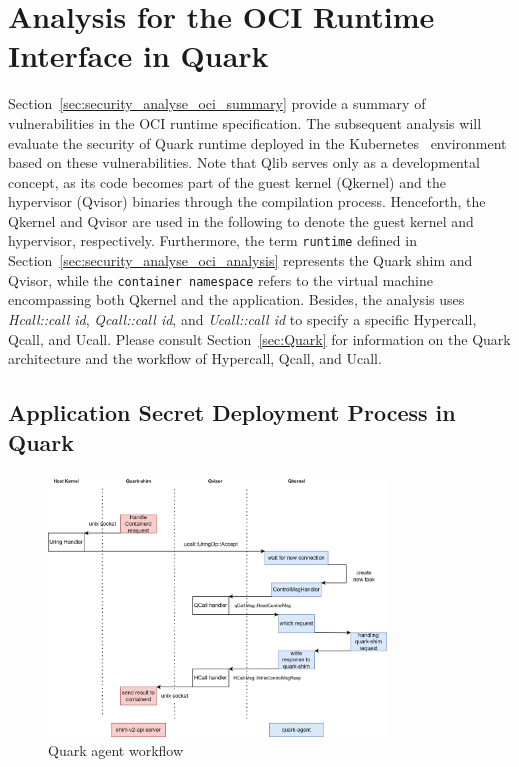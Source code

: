 \section{Analysis for the OCI Runtime Interface in Quark}
\label{sec:security_analyse_quark_analysis}
Section~\ref{sec:security_analyse_oci_summary} provide a summary of vulnerabilities in the OCI runtime specification. The subsequent analysis will evaluate the security of Quark runtime deployed in the Kubernetes~\cite*{k8s} environment based on these vulnerabilities. Note that Qlib serves 
only as a developmental concept, as its code becomes part of the guest kernel (Qkernel) and the hypervisor (Qvisor) binaries through the compilation process. Henceforth, the Qkernel and Qvisor are used in the following to denote the guest kernel and hypervisor, respectively. Furthermore, the 
term \texttt{runtime} defined in Section~\ref{sec:security_analyse_oci_analysis} represents the Quark shim and Qvisor, while the \texttt{container namespace} 
refers to the virtual machine encompassing both Qkernel and the application. Besides, the analysis uses \emph{Hcall::call id}, \emph{Qcall::call id}, and \emph{Ucall::call id} to specify a specific Hypercall, Qcall, and Ucall. Please consult Section~\ref{sec:Quark} for information on the 
Quark architecture and the workflow of Hypercall, Qcall, and Ucall.


\subsection{Application Secret Deployment Process in Quark}
\label{sec:security_analyse_secret_deployment}
\begin{figure}[htp]
    \centering
    \includegraphics[width=0.8\textwidth]{images/quark-agent-work-flow.png}
    \caption[Quark Agent Workflow]{Quark agent workflow}
    \label{fig:quark_agent_work_flow}
\end{figure}


